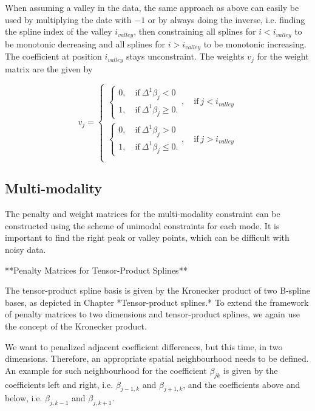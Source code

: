 \documentclass[10pt,a4paper]{article}
\begin{document}
	When assuming a valley in the data, the same approach as above can easily be used by multiplying the date with $-1$ or by always doing the inverse, i.e. finding the spline index of the valley $i_{valley}$, then constraining all splines for $i < i_{valley}$ to be monotonic decreasing and all splines for $i > i_{valley}$ to be monotonic increasing. The coefficient at position $i_{valley}$ stays unconstraint. The weights $v_j$ for the weight matrix are the given by
	
	$$v_j = \begin{cases}\begin{cases} 0, \quad \text{if} \ \Delta^1\beta_j < 0 \\ 
	1, \quad \text{if} \ \Delta^1\beta_j \ge 0.\end{cases}  , \quad \text{if} \ j < i_{valley}  \\ \begin{cases} 0, \quad \text{if} \ \Delta^1\beta_j > 0 \\ 
	1, \quad \text{if} \ \Delta^1\beta_j \le 0.\end{cases}, \quad \text{if} \ j > i_{valley} \\ \end{cases}$$
	
	\subsection{Multi-modality} 
	
	The penalty and weight matrices for the multi-modality constraint can be constructed using the scheme of unimodal constraints for each mode. It is important to find the right peak or valley points, which can be difficult with noisy data. 
	
	**Penalty Matrices for Tensor-Product Splines**
	
	The tensor-product spline basis is given by the Kronecker product of two B-spline bases, as depicted in Chapter *Tensor-product splines.* To extend the framework of penalty matrices to two dimensions and tensor-product splines, we again use the concept of the Kronecker product. 
	
	We want to penalized adjacent coefficient differences, but this time, in two dimensions. Therefore, an appropriate spatial neighbourhood needs to be defined. An example for such neighbourhood for the coefficient $\beta_{jk}$ is given by the coefficients left and right, i.e. $\beta_{j-1, k}$ and $\beta_{j+1, k}$, and the coefficients above and below, i.e. $\beta_{j, k-1}$ and $\beta_{j,k+1}$. 
	
\end{document}
